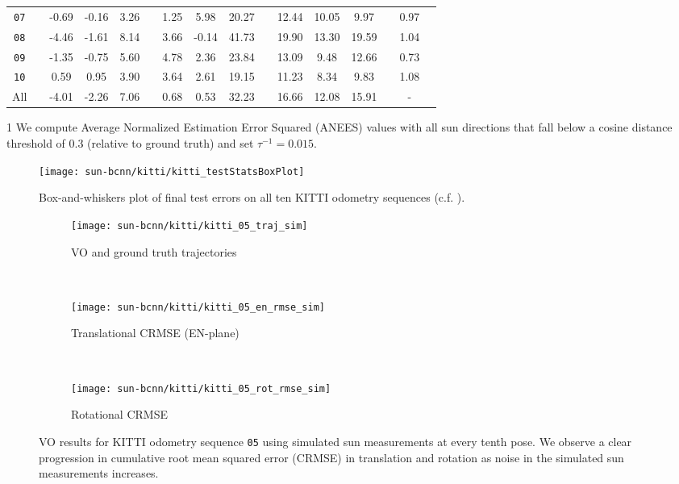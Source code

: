 \begin{table}
{\begin{threeparttable}
\begin{tabular}{@{}cccccccccccccccc@{}}
\texttt{07}     &  & -0.69  & -0.16  & 3.26           &  & 1.25   & 5.98   & 20.27           &  & 12.44 & 10.05  & 9.97  &  & 0.97 \\
\texttt{08}     &  & -4.46  & -1.61  & 8.14           &  & 3.66   & -0.14  & 41.73           &  & 19.90 & 13.30  & 19.59 &  & 1.04 \\
\texttt{09}     &  & -1.35  & -0.75  & 5.60           &  & 4.78   & 2.36   & 23.84           &  & 13.09 & 9.48   & 12.66 &  & 0.73 \\
\texttt{10}     &  & 0.59   & 0.95   & 3.90           &  & 3.64   & 2.61   & 19.15           &  & 11.23 & 8.34   & 9.83  &  & 1.08 \B \\ \midrule
All                &  & -4.01  & -2.26  & 7.06           &  & 0.68   & 0.53   & 32.23           &  & 16.66 & 12.08  & 15.91 & & - &  \\ \bottomrule    
\end{tabular}
\begin{tablenotes}
	\item[1] We compute Average Normalized Estimation Error Squared (ANEES) values with all sun directions that fall below a cosine distance threshold of $0.3$ (relative to ground truth) and set $\tau^{-1} = 0.015$.
 \end{tablenotes}
\end{threeparttable}
}
\end{table}

\begin{figure}
    \centering
    \texttt{[image: sun-bcnn/kitti/kitti\_testStatsBoxPlot]}
    \caption{Box-and-whiskers plot of final test errors on all ten KITTI odometry sequences (c.f. ).}
    \label{fig:kitti_test_error_whiskers}
\end{figure}

\begin{figure}
	\centering
	 \begin{subfigure}{0.42\textwidth}
    	\texttt{[image: sun-bcnn/kitti/kitti\_05\_traj\_sim]}
        \caption{VO and ground truth trajectories}
    \end{subfigure}
    ~
    \begin{subfigure}{0.42\textwidth}
    	\vspace{-8pt}
    	\texttt{[image: sun-bcnn/kitti/kitti\_05\_en\_rmse\_sim]}
        \caption{Translational CRMSE (EN-plane)}
    \end{subfigure}
    ~
    \begin{subfigure}{0.42\textwidth}
    	\texttt{[image: sun-bcnn/kitti/kitti\_05\_rot\_rmse\_sim]}
        \caption{Rotational CRMSE}
    \end{subfigure}

    \caption{VO results for KITTI odometry sequence \texttt{05} using simulated sun measurements at every tenth pose. We observe a clear progression in cumulative root mean squared error (CRMSE) in translation and rotation as noise in the simulated sun measurements increases.}
     \label{fig:kitti-vo-sim-results}
\end{figure}

